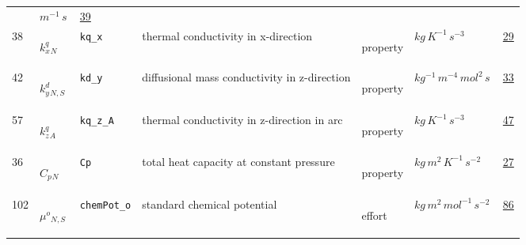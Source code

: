 \begin{longtable}{|p{1cm}|p{2.5cm}|p{4.5cm}|p{8cm}|p{3.0cm}|p{3cm}|p{1cm}|}
             & $ m^{-1} \,s \, $
             &                 \hyperlink{"e:39"}{ 39 }
                 \\
            38
             & \hypertarget{"v:38"}{ $ {{k^q_x}}{_{N}} $}
             & \verb|kq_x|
             & thermal conductivity in x-direction
             & \begin{lay}property \end{lay}
             & $ kg \,K^{-1} \,s^{-3} \, $
             &                 \hyperlink{"e:29"}{ 29 }
                 \\
            42
             & \hypertarget{"v:42"}{ $ {{k^d_y}}{_{N, S}} $}
             & \verb|kd_y|
             & diffusional mass conductivity in z-direction
             & \begin{lay}property \end{lay}
             & $ kg^{-1} \,m^{-4} \,mol^{2} \,s \, $
             &                 \hyperlink{"e:33"}{ 33 }
                 \\
            57
             & \hypertarget{"v:57"}{ $ {{k^q_z}}{_{A}} $}
             & \verb|kq_z_A|
             & thermal conductivity in z-direction in arc
             & \begin{lay}property \end{lay}
             & $ kg \,K^{-1} \,s^{-3} \, $
             &                 \hyperlink{"e:47"}{ 47 }
                 \\
            36
             & \hypertarget{"v:36"}{ $ {{C_p}}{_{N}} $}
             & \verb|Cp|
             & total heat capacity at constant pressure
             & \begin{lay}property \end{lay}
             & $ kg \,m^{2} \,K^{-1} \,s^{-2} \, $
             &                 \hyperlink{"e:27"}{ 27 }
                 \\
            102
             & \hypertarget{"v:102"}{ $ {{\mu^o}}{_{N, S}} $}
             & \verb|chemPot_o|
             & standard chemical potential
             & \begin{lay}effort \end{lay}
             & $ kg \,m^{2} \,mol^{-1} \,s^{-2} \, $
             &                 \hyperlink{"e:86"}{ 86 }
                 \\
    \end{longtable}